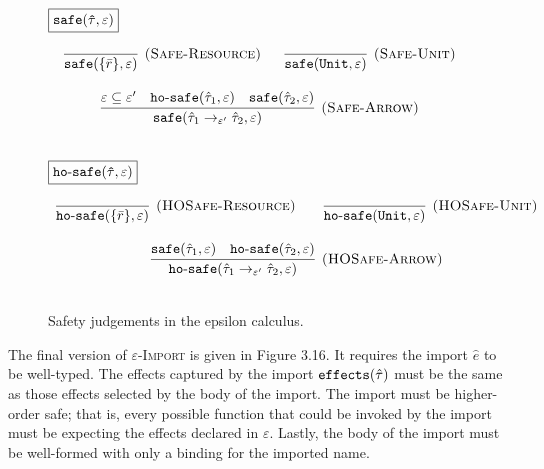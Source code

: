 \begin{figure}[h]

\noindent
$\fbox{$\mathtt{safe(\hat \tau, \varepsilon)}$}$

\[
\begin{array}{c}

\infer[\textsc{(Safe-Resource)}]
	{\kwa{safe}(\{ \bar r \}, \varepsilon)}
	{}
~~~~~
\infer[\textsc{(Safe-Unit)}]
	{\kwa{safe}(\kwa{Unit}, \varepsilon)}
	{} \\[3ex]

\infer[\textsc{(Safe-Arrow)}]
	{\kwa{safe}(\hat \tau_1 \rightarrow_{\varepsilon'} \hat \tau_2, \varepsilon)}
	{\varepsilon \subseteq \varepsilon' & \kwa{ho \hyphen safe}(\hat \tau_1, \varepsilon) & \kwa{safe}(\hat \tau_2, \varepsilon)} \\[3ex]

\end{array}
\]

\noindent
$\fbox{$\mathtt{ho \hbox{-} safe(\hat \tau, \varepsilon)}$}$

\[
\begin{array}{c}

\infer[\textsc{(HOSafe-Resource)}]
	{ \kwa{ho \hyphen safe}( \{ \bar r \}, \varepsilon)} 
	{}
	~~~~~~
\infer[\textsc{(HOSafe-Unit)}]
	{ \kwa{ho \hyphen safe}( \kwa{Unit}, \varepsilon)} 
	{}\\[3ex]

\infer[\textsc{(HOSafe-Arrow)}]
	{ \kwa{ho \hyphen safe}( \hat \tau_1 \rightarrow_{\varepsilon'} \hat \tau_2, \varepsilon ) }
	{ \kwa{safe}(\hat \tau_1, \varepsilon)  & \kwa{ho \hyphen safe}(\hat \tau_2, \varepsilon) }\\[3ex]

\end{array}
\]

\vspace{-7pt}
\caption{Safety judgements in the epsilon calculus.}
\label{This is the label.}
\end{figure}

The final version of \textsc{$\varepsilon$-Import} is given in Figure 3.16. It requires the import $\hat e$ to be well-typed. The effects captured by the import $\mathtt{effects}(\hat \tau)$ must be the same as those effects selected by the body of the import. The import must be higher-order safe; that is, every possible function that could be invoked by the import must be expecting the effects declared in $\varepsilon$. Lastly, the body of the import must be well-formed with only a binding for the imported name.

